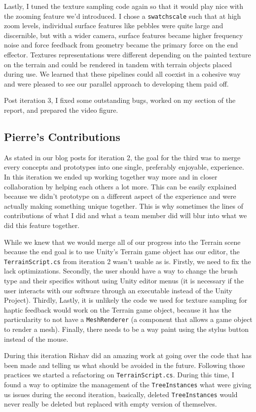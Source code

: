Lastly, I tuned the texture sampling code again so that it would play nice with the zooming feature we’d introduced. I chose a \texttt{swatchscale} such that at high zoom levels, individual surface features like pebbles were quite large and discernible, but with a wider camera, surface features became higher frequency noise and force feedback from geometry became the primary force on the end effector. Textures representations were different depending on the painted texture on the terrain and could be rendered in tandem with terrain objects placed during use. We learned that these pipelines could all coexist in a cohesive way and were pleased to see our parallel approach to developing them paid off.

Post iteration 3, I fixed some outstanding bugs, worked on my section of the report, and prepared the video figure.

\subsection{Pierre's Contributions}
As stated in our blog posts for iteration 2, the goal for the third was to merge every concepts and prototypes into one single, preferably enjoyable, experience. In this iteration we ended up working together way more and in closer collaboration by helping each others a lot more. This can be easily explained because we didn’t prototype on a different aspect of the experience and were actually making something unique together. This is why sometimes the lines of contributions of what I did and what a team member did will blur into what we did this feature together.

While we knew that we would merge all of our progress into the Terrain scene because the end goal is to use Unity’s Terrain game object has our editor, the \texttt{TerrainScript.cs} from iteration 2 wasn’t usable as is. Firstly, we need to fix the lack optimizations. Secondly, the user should have a way to change the brush type and their specifics without using Unity editor menus (it is necessary if the user interacts with our software through an executable instead of the Unity Project). Thirdly, Lastly, it is unlikely the code we used for texture sampling for haptic feedback would work on the Terrain game object, because it has the particularity to not have a \texttt{MeshRenderer} (a component that allows a game object to render a mesh). Finally, there needs to be a way paint using the stylus button instead of the mouse.

During this iteration Rishav did an amazing work at going over the code that has been made and telling us what should be avoided in the future. Following those practices we started a refactoring on \texttt{TerrainScript.cs}.  During this time, I found a way to optimize the management of the \texttt{TreeInstances} what were giving us issues during the second iteration, basically, deleted \texttt{TreeInstances} would never really be deleted but replaced with empty version of themselves.

